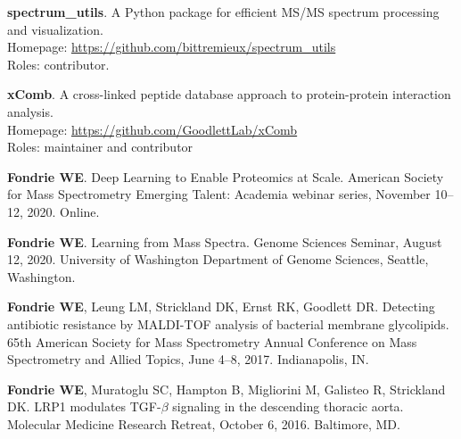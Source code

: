 \documentclass[11pt]{article}
\newcommand{\mysection}[1]{\vspace{1ex {\bf \large \textrm{#1}} \quad
    \hrulefill}}
\newcommand{\myref}[1]{\href{#1}{\url{#1}}}
\begin{document}
\begin{etaremune}
 \item {\bf spectrum\_utils}. A Python package for efficient MS/MS spectrum
   processing and visualization. \\
   Homepage: \myref{https://github.com/bittremieux/spectrum_utils} \\
   Roles: contributor.

 \item {\bf xComb}. A cross-linked peptide database approach to protein-protein
   interaction analysis. \\
   Homepage: \myref{https://github.com/GoodlettLab/xComb} \\
   Roles: maintainer and contributor

\end{etaremune}

\mysection{Talks}
\begin{etaremune}
  \item {\bf Fondrie WE}. Deep Learning to Enable Proteomics at Scale. American
    Society for Mass Spectrometry Emerging Talent: Academia webinar series,
    November 10--12, 2020. Online.
  
  \item {\bf Fondrie WE}. Learning from Mass Spectra. Genome Sciences
    Seminar, August 12, 2020. University of Washington Department of Genome
    Sciences, Seattle, Washington.
  
  \item {\bf Fondrie WE}, Leung LM, Strickland DK, Ernst RK, Goodlett DR.
    Detecting antibiotic resistance by MALDI-TOF analysis of bacterial membrane
    glycolipids. 65th American Society for Mass Spectrometry Annual Conference
    on Mass Spectrometry and Allied Topics, June 4--8, 2017. Indianapolis, IN.
    
  \item {\bf Fondrie WE}, Muratoglu SC, Hampton B, Migliorini M, Galisteo R,
    Strickland DK. LRP1 modulates TGF-$\beta$ signaling in the descending
    thoracic aorta. Molecular Medicine Research Retreat, October 6, 2016.
    Baltimore, MD.
\end{etaremune}
\end{document}
